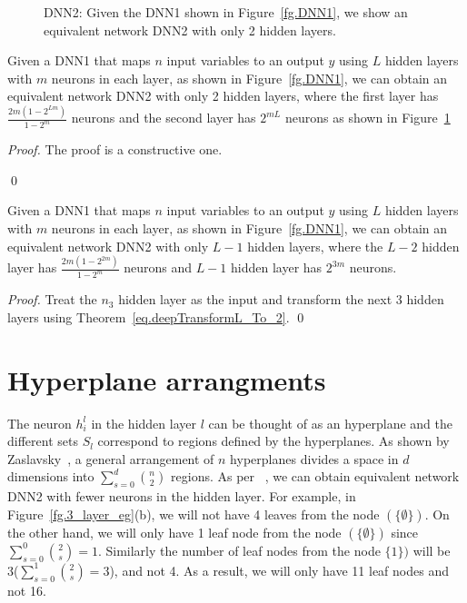 \documentclass[runningheads,a4paper]{llncs}
\begin{document}
\begin{figure*}[!htbp]
\begin{center}
\end{center}
\caption{{\sc DNN2:} Given the {\sc DNN1} shown in Figure~\ref{fg.DNN1}, we show an equivalent network {\sc DNN2} with only 2 hidden layers.}
\label{fg.DNN2}
\end{figure*}

\begin{theorem}
Given a {\sc DNN1} that maps $n$ input variables to an output $y$ using $L$ hidden layers with $m$ neurons in each layer, as shown in Figure~\ref{fg.DNN1}, we can obtain an equivalent network {\sc DNN2} with only 2 hidden layers, where the first layer has $\frac{2m(1-2^{Lm})}{1-2^m}$ neurons and the second layer has $2^{mL}$ neurons as shown in Figure~\ref{fg.DNN2}
\label{eq.deepTransformL_To_2}
\end{theorem}
\begin{proof}
The proof is a constructive one. 

\qed
\end{proof}

\begin{theorem}
Given a {\sc DNN1} that maps $n$ input variables to an output $y$ using $L$ hidden layers with $m$ neurons in each layer, as shown in Figure~\ref{fg.DNN1}, we can obtain an equivalent network {\sc DNN2} with only $L-1$ hidden layers, where the $L-2$ hidden layer has $\frac{2m(1-2^{2m})}{1-2^m}$ neurons and $L-1$ hidden layer has $2^{3m}$ neurons.
\label{eq.deepTransformL_To_L-1}
\end{theorem}
\begin{proof}
Treat the $n_3$ hidden layer as the input and transform the next 3 hidden layers using Theorem~\ref{eq.deepTransformL_To_2}.
\qed
\end{proof}


\section{Hyperplane arrangments}
The neuron $h^l_i$ in the hidden layer $l$ can be thought of as an hyperplane and the different sets $S_l$ correspond to regions defined by the hyperplanes. 
As shown by Zaslavsky~\cite{Zaslavsky1975}, a general arrangement of $n$ hyperplanes divides a space in $d$ dimensions into $\sum_{s=0}^d {n \choose 2}$ regions. As per ~\cite{Zaslavsky1975}, we can obtain equivalent network {\sc DNN2} with fewer neurons in the hidden layer. For example, in Figure~\ref{fg.3_layer_eg}(b), we will not have 4 leaves from the node $(\{\emptyset\})$. On the other hand, we will only have 1 leaf node from the node $(\{\emptyset\})$ since $\sum_{s=0}^0 {2 \choose s} = 1$. Similarly the number of leaf nodes from the node $\{1\})$ will be 3($\sum_{s=0}^1 {2 \choose s} = 3$), and not 4. As a result, we will only have 11 leaf nodes and not 16. 
\end{document}
